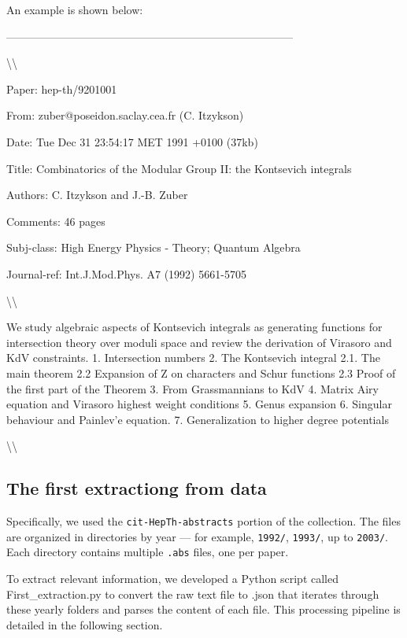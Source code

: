 \documentclass[12pt]{article}
\begin{document}
An example is shown below:

\begin{tcolorbox}
------------------------------------------------------------------------------

\textbackslash\textbackslash{}

Paper: hep-th/9201001

From: zuber@poseidon.saclay.cea.fr (C. Itzykson)

Date: Tue Dec 31 23:54:17 MET 1991 +0100   (37kb)

Title: Combinatorics of the Modular Group II: the Kontsevich integrals

Authors: C. Itzykson and J.-B. Zuber

Comments: 46 pages

Subj-class: High Energy Physics - Theory; Quantum Algebra

Journal-ref: Int.J.Mod.Phys. A7 (1992) 5661-5705

\textbackslash\textbackslash{}

We study algebraic aspects of Kontsevich integrals as generating functions for intersection theory over moduli space and review the derivation of Virasoro and KdV constraints.
1. Intersection numbers
2. The Kontsevich integral
2.1. The main theorem
2.2 Expansion of Z on characters and Schur functions
2.3 Proof of the first part of the Theorem
3. From Grassmannians to KdV
4. Matrix Airy equation and Virasoro highest weight conditions
5. Genus expansion
6. Singular behaviour and Painlev'e equation.
7. Generalization to higher degree potentials
 
\textbackslash\textbackslash{}
\end{tcolorbox}


\subsection{The first extractiong from data}

Specifically, we used the \texttt{cit-HepTh-abstracts} portion of the collection. The files are organized in directories by year --- for example, \texttt{1992/}, \texttt{1993/}, up to \texttt{2003/}. Each directory contains multiple \texttt{.abs} files, one per paper.

To extract relevant information, we developed a Python script called First\_extraction.py to convert the raw text file to .json that iterates through these yearly folders and parses the content of each file. This processing pipeline is detailed in the following section.
\end{document}
